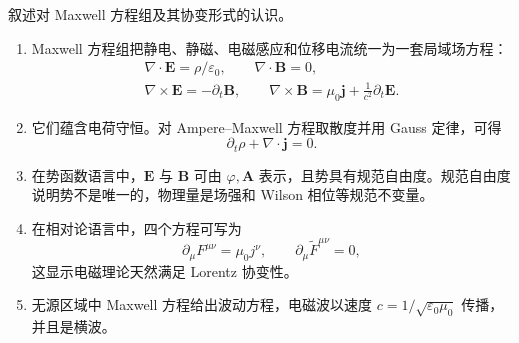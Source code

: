 \begin{question}
叙述对 Maxwell 方程组及其协变形式的认识。
\begin{solution}
\begin{enumerate}
  \item Maxwell 方程组把静电、静磁、电磁感应和位移电流统一为一套局域场方程：
  \[
  \begin{gathered}
    \nabla\cdot\mathbf E=\rho/\varepsilon_0,
    \qquad
    \nabla\cdot\mathbf B=0,\\
    \nabla\times\mathbf E=-\partial_t\mathbf B,
    \qquad
    \nabla\times\mathbf B=\mu_0\mathbf j+\frac1{c^2}\partial_t\mathbf E .
  \end{gathered}
  \]
  \item 它们蕴含电荷守恒。对 Ampere--Maxwell 方程取散度并用 Gauss 定律，可得
  \[
    \partial_t\rho+\nabla\cdot\mathbf j=0 .
  \]
  \item 在势函数语言中，$\mathbf E$ 与 $\mathbf B$ 可由 $\varphi,\mathbf A$ 表示，且势具有规范自由度。规范自由度说明势不是唯一的，物理量是场强和 Wilson 相位等规范不变量。
  \item 在相对论语言中，四个方程可写为
  \[
    \partial_\mu F^{\mu\nu}=\mu_0j^\nu,
    \qquad
    \partial_\mu\tilde F^{\mu\nu}=0,
  \]
  这显示电磁理论天然满足 Lorentz 协变性。
  \item 无源区域中 Maxwell 方程给出波动方程，电磁波以速度 $c=1/\sqrt{\varepsilon_0\mu_0}$ 传播，并且是横波。
\end{enumerate}
\end{solution}
\end{question}
